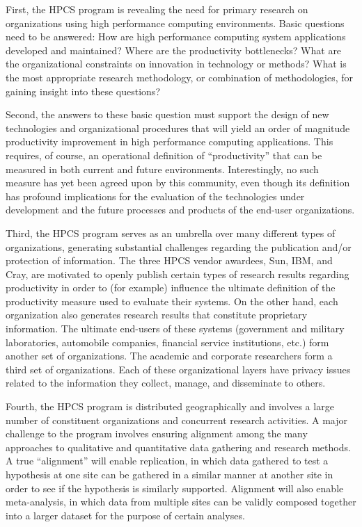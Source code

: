 First, the HPCS program is revealing the need for primary research on
organizations using high performance computing environments. Basic
questions need to be answered: How are high performance computing system
applications developed and maintained?  Where are the productivity
bottlenecks? What are the organizational constraints on innovation in
technology or methods? What is the most appropriate research methodology,
or combination of methodologies, for gaining insight into these questions?

Second, the answers to these basic question must support the design of new
technologies and organizational procedures that will yield an order of
magnitude productivity improvement in high performance computing
applications.  This requires, of course, an operational definition of
``productivity'' that can be measured in both current and future
environments.  Interestingly, no such measure has yet been agreed upon by
this community, even though its definition has profound implications for
the evaluation of the technologies under development and the future
processes and products of the end-user organizations.

Third, the HPCS program serves as an umbrella over many different types of
organizations, generating substantial challenges regarding the publication
and/or protection of information.  The three HPCS vendor awardees, Sun,
IBM, and Cray, are motivated to openly publish certain types of research
results regarding productivity in order to (for example) influence the
ultimate definition of the productivity measure used to evaluate their
systems. On the other hand, each organization also generates research
results that constitute proprietary information. The ultimate end-users of
these systems (government and military laboratories, automobile companies,
financial service institutions, etc.)  form another set of organizations.
The academic and corporate researchers form a third set of
organizations. Each of these organizational layers have privacy issues
related to the information they collect, manage, and disseminate to others.

Fourth, the HPCS program is distributed geographically and involves a large
number of constituent organizations and concurrent research activities.  A
major challenge to the program involves ensuring alignment among the many
approaches to qualitative and quantitative data gathering and research
methods.  A true ``alignment'' will enable replication, in which data
gathered to test a hypothesis at one site can be gathered in a similar
manner at another site in order to see if the hypothesis is similarly
supported.  Alignment will also enable meta-analysis, in which data from
multiple sites can be validly composed together into a larger dataset for
the purpose of certain analyses.

